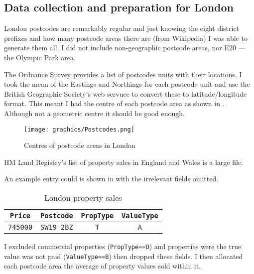\documentclass[a4paper,12pt,final,UKenglish]{article}
\begin{document}
        \subsection{Data collection and preparation for London}
            London postcodes are remarkably regular and just knowing the eight district prefixes and how many postcode areas there are (from Wikipedia) I was able
            to generate them all.  I did not include non-geographic postcode areas, nor E20 --- the Olympic Park area.
            
            The Ordnance Survey provides a list of postcodes units with their locations.  I took the mean of the Eastings and Northings for each postcode
            unit and use the British Geographic Society's web servuce to convert these to latitude/longitude format.  This meant I had the centre of each
            postcode area as shown in .  Although not a geometric centre it should be good enough.
            \begin{figure}[htb]
                \centering
                \texttt{[image: graphics/Postcodes.png]}
                \caption{Centres of postcode areas in London}
                \label{fig:postcodes}
            \end{figure}

            HM Land Registry's list of property sales in England and Wales is a large file.

            An example entry could is shown in  with the irrelevant fields omitted.
            \begin{table}[ht]
                \centering
                \begin{tabular}{c|c|c|c}
                    \texttt{Price}  & \texttt{Postcode} & \texttt{PropType} & \texttt{ValueType}\\\hline
                    \texttt{745000} & \texttt{SW19 2BZ} & \texttt{T}        & \texttt{A}
                \end{tabular}
                \caption{London property sales}
                \label{fig:hmlr_data}
            \end{table}

            I excluded commercial properties (\texttt{PropType==O}) and properties were the true value was not paid (\texttt{ValueType==B})
            then dropped these fields.  I then allocated each postcode area the average of property values sold within it.
            
\end{document}
